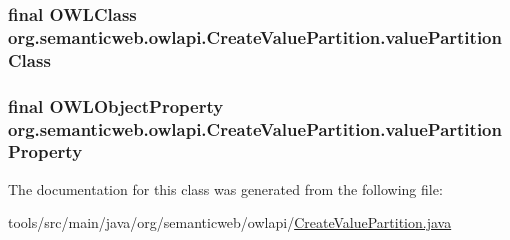 \hypertarget{classorg_1_1semanticweb_1_1owlapi_1_1_create_value_partition_ad0545108ace014a623992232fafee5b7}{
\subsubsection[{value\-Partition\-Class}]{\setlength{\rightskip}{0pt plus 5cm}final {\bf O\-W\-L\-Class} org.\-semanticweb.\-owlapi.\-Create\-Value\-Partition.\-value\-Partition\-Class\hspace{0.3cm}{\ttfamily [private]}}}\label{classorg_1_1semanticweb_1_1owlapi_1_1_create_value_partition_ad0545108ace014a623992232fafee5b7}
\hypertarget{classorg_1_1semanticweb_1_1owlapi_1_1_create_value_partition_ac88312b96c91192a43e20b2b78df3860}{
\subsubsection[{value\-Partition\-Property}]{\setlength{\rightskip}{0pt plus 5cm}final {\bf O\-W\-L\-Object\-Property} org.\-semanticweb.\-owlapi.\-Create\-Value\-Partition.\-value\-Partition\-Property\hspace{0.3cm}{\ttfamily [private]}}}\label{classorg_1_1semanticweb_1_1owlapi_1_1_create_value_partition_ac88312b96c91192a43e20b2b78df3860}


The documentation for this class was generated from the following file\-:\begin{DoxyCompactItemize}
\item 
tools/src/main/java/org/semanticweb/owlapi/\hyperlink{_create_value_partition_8java}{Create\-Value\-Partition.\-java}\end{DoxyCompactItemize}
